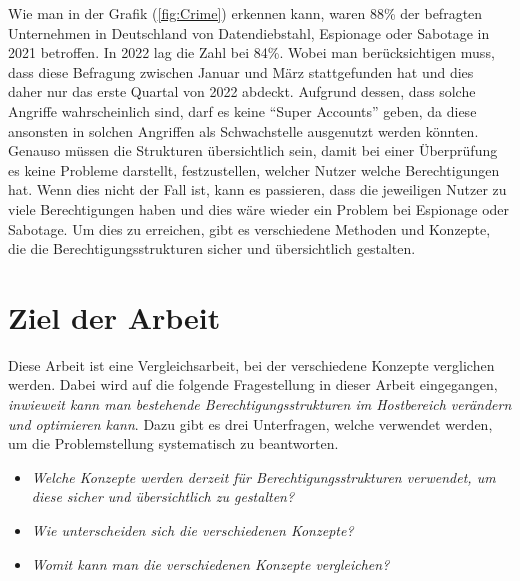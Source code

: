 Wie man in der Grafik (\ref{fig:Crime}) erkennen kann, waren 88\% der befragten Unternehmen in Deutschland von Datendiebstahl, Espionage oder Sabotage in 2021 betroffen.
In 2022 lag die Zahl bei 84\%.
Wobei man berücksichtigen muss, dass diese Befragung zwischen Januar und März stattgefunden hat und dies daher nur das erste Quartal von 2022 abdeckt.
Aufgrund dessen, dass solche Angriffe wahrscheinlich sind, darf es keine "`Super Accounts"' geben, da diese ansonsten in solchen Angriffen als Schwachstelle ausgenutzt werden könnten.
Genauso müssen die Strukturen übersichtlich sein, damit bei einer Überprüfung es keine Probleme darstellt, festzustellen, welcher Nutzer welche Berechtigungen hat.
Wenn dies nicht der Fall ist, kann es passieren, dass die jeweiligen Nutzer zu viele Berechtigungen haben und dies wäre wieder ein Problem bei Espionage oder Sabotage.
Um dies zu erreichen, gibt es verschiedene Methoden und Konzepte, die die Berechtigungsstrukturen sicher und übersichtlich gestalten.

%
%
\section{Ziel der Arbeit}
\label{sec:intro:goal}
Diese Arbeit ist eine Vergleichsarbeit, bei der verschiedene Konzepte verglichen werden.
Dabei wird auf die folgende Fragestellung in dieser Arbeit eingegangen, \textit{inwieweit kann man bestehende Berechtigungsstrukturen im Hostbereich verändern und optimieren kann}.
Dazu gibt es drei Unterfragen, welche verwendet werden, um die Problemstellung systematisch zu beantworten.

\begin{itemize}
  \item \textit{Welche Konzepte werden derzeit für Berechtigungsstrukturen verwendet, um diese sicher und übersichtlich zu gestalten?}
  \item \textit{Wie unterscheiden sich die verschiedenen Konzepte?}
  \item \textit{Womit kann man die verschiedenen Konzepte vergleichen?}
\end{itemize}

